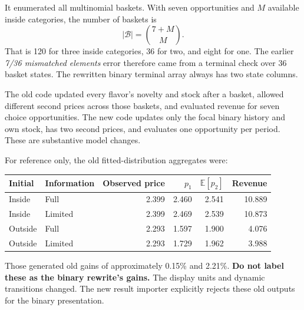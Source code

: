 \documentclass[11pt]{article}
\newcommand{\E}{\mathbb{E}}
\begin{document}
It enumerated all multinomial baskets. With seven opportunities and $M$ available inside categories, the number of baskets is
\[
 |\mathcal B|={7+M\choose M}.
\]
That is 120 for three inside categories, 36 for two, and eight for one. The earlier \emph{7/36 mismatched elements} error therefore came from a terminal check over 36 basket states. The rewritten binary terminal array always has two state columns.

The old code updated every flavor's novelty and stock after a basket, allowed different second prices across those baskets, and evaluated revenue for seven choice opportunities. The new code updates only the focal binary history and own stock, has two second prices, and evaluates one opportunity per period. These are substantive model changes.

For reference only, the old fitted-distribution aggregates were:
\begin{center}\begin{tabular}{llrrrr}\toprule
Initial & Information & Observed price & $p_1$ & $\E[p_2]$ & Revenue\\\midrule
Inside & Full & 2.399 & 2.460 & 2.541 & 10.889\\
Inside & Limited & 2.399 & 2.469 & 2.539 & 10.873\\
Outside & Full & 2.293 & 1.597 & 1.900 & 4.076\\
Outside & Limited & 2.293 & 1.729 & 1.962 & 3.988\\\bottomrule
\end{tabular}\end{center}
Those generated old gains of approximately 0.15\% and 2.21\%. \textbf{Do not label these as the binary rewrite's gains.} The display units and dynamic transitions changed. The new result importer explicitly rejects these old outputs for the binary presentation.
\end{document}
